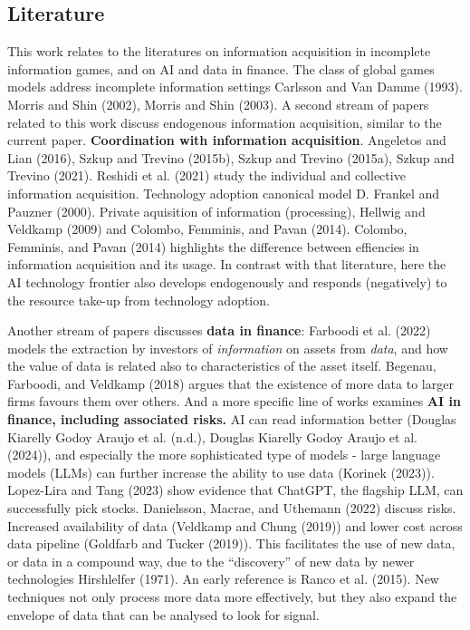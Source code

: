 \documentclass[
]{article}
\theoremstyle{definition}
\theoremstyle{plain}
\theoremstyle{remark}
\begin{document}
\subsection{Literature}\label{literature}

This work relates to the literatures on information acquisition in
incomplete information games, and on AI and data in finance. The class
of global games models address incomplete information settings Carlsson
and Van Damme (1993). Morris and Shin (2002), Morris and Shin (2003). A
second stream of papers related to this work discuss endogenous
information acquisition, similar to the current paper.
\textbf{Coordination with information acquisition}. Angeletos and Lian
(2016), Szkup and Trevino (2015b), Szkup and Trevino (2015a), Szkup and
Trevino (2021). Reshidi et al. (2021) study the individual and
collective information acquisition. Technology adoption canonical model
D. Frankel and Pauzner (2000). Private aquisition of information
(processing), Hellwig and Veldkamp (2009) and Colombo, Femminis, and
Pavan (2014). Colombo, Femminis, and Pavan (2014) highlights the
difference between effiencies in information acquisition and its usage.
In contrast with that literature, here the AI technology frontier also
develops endogenously and responds (negatively) to the resource take-up
from technology adoption.

Another stream of papers discusses \textbf{data in finance}: Farboodi et
al. (2022) models the extraction by investors of \emph{information} on
assets from \emph{data}, and how the value of data is related also to
characteristics of the asset itself. Begenau, Farboodi, and Veldkamp
(2018) argues that the existence of more data to larger firms favours
them over others. And a more specific line of works examines \textbf{AI
in finance, including associated risks.} AI can read information better
(Douglas Kiarelly Godoy Araujo et al. (n.d.), Douglas Kiarelly Godoy
Araujo et al. (2024)), and especially the more sophisticated type of
models - large language models (LLMs) can further increase the ability
to use data (Korinek (2023)). Lopez-Lira and Tang (2023) show evidence
that ChatGPT, the flagship LLM, can successfully pick stocks.
Danielsson, Macrae, and Uthemann (2022) discuss risks. Increased
availability of data (Veldkamp and Chung (2019)) and lower cost across
data pipeline (Goldfarb and Tucker (2019)). This facilitates the use of
new data, or data in a compound way, due to the ``discovery'' of new
data by newer technologies Hirshlelfer (1971). An early reference is
Ranco et al. (2015). New techniques not only process more data more
effectively, but they also expand the envelope of data that can be
analysed to look for signal.
\end{document}
